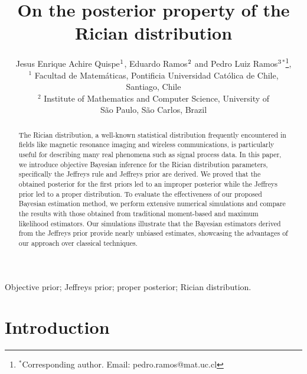 \documentclass[12pt]{interact}
\theoremstyle{plain}%
\theoremstyle{definition}
\theoremstyle{remark}
\begin{document}
\articletype{ }

\title{On the posterior property of the Rician distribution}

\author{ Jesus Enrique Achire Quispe$^{\rm 1}$, Eduardo Ramos$^{\rm 2}$ and  Pedro Luiz Ramos$^{\rm 3}$$^{\ast}$\thanks{$^\ast$Corresponding author. Email: pedro.ramos@mat.uc.cl
\vspace{6pt}}, \\\vspace{6pt} 
\normalsize{$^{1}$ Facultad de Matemáticas, Pontificia Universidad Católica de Chile, \\ Santiago, Chile} \\  
\normalsize{$^{2}$ Institute of Mathematics and Computer Science, University of \\ S\~ao Paulo, S\~ao Carlos, Brazil}
}



\maketitle

\begin{abstract}
The Rician distribution, a well-known statistical distribution frequently encountered in fields like magnetic resonance imaging and wireless communications, is particularly useful for describing many real phenomena such as signal process data. In this paper, we introduce objective Bayesian inference for the Rician distribution parameters, specifically the Jeffreys rule and Jeffreys prior are derived. We proved that the obtained posterior for the first priors led to an improper posterior while the Jeffreys prior led to a proper distribution.
To evaluate the effectiveness of our proposed Bayesian estimation method, we perform extensive numerical simulations and compare the results with those obtained from traditional moment-based and maximum likelihood estimators. Our simulations illustrate that the Bayesian estimators derived from the Jeffreys prior provide nearly unbiased estimates, showcasing the advantages of our approach over classical techniques.
\end{abstract}

\begin{keywords}
Objective prior;  Jeffreys prior; proper posterior; Rician distribution.
\end{keywords}


\section{Introduction}
\end{document}
